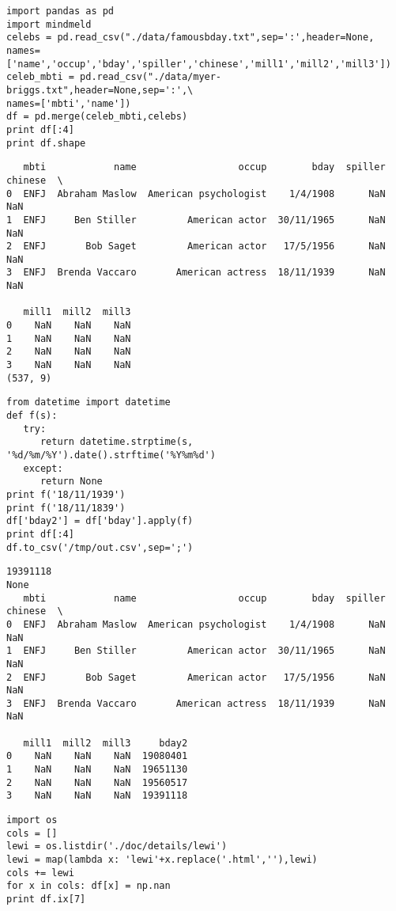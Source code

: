 \documentclass[12pt,fleqn]{article}\usepackage{common}
\begin{document}
\begin{verbatim}
import pandas as pd
import mindmeld
celebs = pd.read_csv("./data/famousbday.txt",sep=':',header=None, 
names=['name','occup','bday','spiller','chinese','mill1','mill2','mill3'])
celeb_mbti = pd.read_csv("./data/myer-briggs.txt",header=None,sep=':',\
names=['mbti','name'])
df = pd.merge(celeb_mbti,celebs)
print df[:4]
print df.shape
\end{verbatim}

\begin{verbatim}
   mbti            name                  occup        bday  spiller  chinese  \
0  ENFJ  Abraham Maslow  American psychologist    1/4/1908      NaN      NaN   
1  ENFJ     Ben Stiller         American actor  30/11/1965      NaN      NaN   
2  ENFJ       Bob Saget         American actor   17/5/1956      NaN      NaN   
3  ENFJ  Brenda Vaccaro       American actress  18/11/1939      NaN      NaN   

   mill1  mill2  mill3  
0    NaN    NaN    NaN  
1    NaN    NaN    NaN  
2    NaN    NaN    NaN  
3    NaN    NaN    NaN  
(537, 9)
\end{verbatim}

\begin{verbatim}
from datetime import datetime
def f(s):
   try:
      return datetime.strptime(s, '%d/%m/%Y').date().strftime('%Y%m%d')
   except: 
      return None
print f('18/11/1939')
print f('18/11/1839')
df['bday2'] = df['bday'].apply(f)
print df[:4]
df.to_csv('/tmp/out.csv',sep=';')
\end{verbatim}

\begin{verbatim}
19391118
None
   mbti            name                  occup        bday  spiller  chinese  \
0  ENFJ  Abraham Maslow  American psychologist    1/4/1908      NaN      NaN   
1  ENFJ     Ben Stiller         American actor  30/11/1965      NaN      NaN   
2  ENFJ       Bob Saget         American actor   17/5/1956      NaN      NaN   
3  ENFJ  Brenda Vaccaro       American actress  18/11/1939      NaN      NaN   

   mill1  mill2  mill3     bday2  
0    NaN    NaN    NaN  19080401  
1    NaN    NaN    NaN  19651130  
2    NaN    NaN    NaN  19560517  
3    NaN    NaN    NaN  19391118  
\end{verbatim}

\begin{verbatim}
import os
cols = []
lewi = os.listdir('./doc/details/lewi')
lewi = map(lambda x: 'lewi'+x.replace('.html',''),lewi)
cols += lewi
for x in cols: df[x] = np.nan
print df.ix[7]
\end{verbatim}
\end{document}

